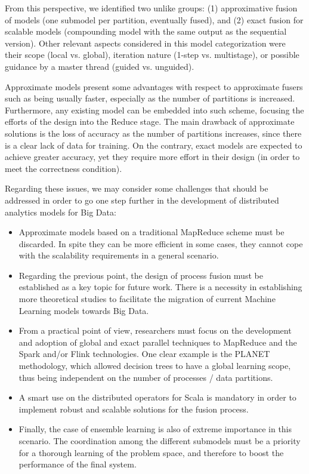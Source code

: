 \documentclass[3p,review]{elsarticle}
\begin{document}
{	From this perspective, we identified two unlike groups: (1) approximative fusion of models (one submodel per partition, eventually fused), and (2) exact fusion for scalable models (compounding model with the same output as the sequential version). Other relevant aspects considered in this model categorization were their scope (local vs. global), iteration nature (1-step vs. multistage), or possible guidance by a master thread (guided vs. unguided).
	
	Approximate models present some advantages with respect to approximate fusers such as being usually faster, especially as the number of partitions is increased. Furthermore, any existing model can be embedded into such scheme, focusing the efforts of the design into the Reduce stage. The main drawback of approximate solutions is the loss of accuracy as the number of partitions increases, since there is a clear lack of data for training. On the contrary, exact models are expected to achieve greater accuracy, yet they require more effort in their design (in order to meet the correctness condition).
	
	Regarding these issues, we may consider some challenges that should be addressed in order to go one step further in the development of distributed analytics models for Big Data:
	
	\begin{itemize}
		\item Approximate models based on a traditional MapReduce scheme must be discarded. In spite they can be more efficient in some cases, they cannot cope with the scalability requirements in a general scenario. 
		\item Regarding the previous point, the design of process fusion must be established as a key topic for future work. There is a necessity in establishing more theoretical studies to facilitate the migration of current Machine Learning models towards Big Data.
		\item From a practical point of view, researchers must focus on the development and adoption of global and exact parallel techniques to MapReduce and the Spark and/or Flink technologies. One clear example is the PLANET methodology, which allowed decision trees to have a global learning scope, thus being independent on the number of processes / data partitions.
		\item A smart use on the distributed operators for Scala is mandatory in order to implement robust and scalable solutions for the fusion process. 
		\item Finally, the case of ensemble learning is also of extreme importance in this scenario. The coordination among the different submodels must be a priority for a thorough learning of the problem space, and therefore to boost the performance of the final system.
	\end{itemize}
		
}
\end{document}
